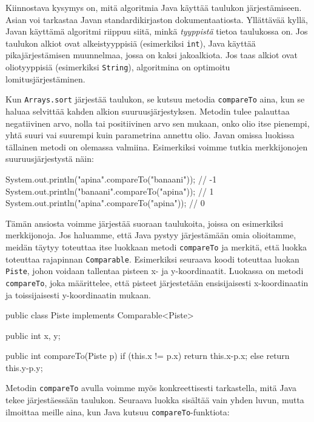 Kiinnostava kysymys on, mitä algoritmia Java käyttää
taulukon järjes\-tämiseen.
Asian voi tarkastaa Javan standardikirjaston
dokumentaatiosta.
Yllättävää kyllä, Javan käyttämä algoritmi riippuu siitä,
minkä \emph{tyyppistä} tietoa taulukossa on.
Jos taulukon alkiot ovat alkeistyyppisiä
(esimerkiksi \texttt{int}), Java käyttää 
pikajärjestämisen muunnelmaa,
jossa on kaksi jakoalkiota.
Jos taas alkiot ovat oliotyyppisiä
(esimerkiksi \texttt{String}),
algoritmina on optimoitu lomitusjärjestäminen.

Kun \texttt{Arrays.sort} järjestää taulukon,
se kutsuu metodia \texttt{compareTo} aina, kun se haluaa selvittää
kahden alkion suuruusjärjestyksen.
Metodin tulee palauttaa negatiivinen arvo, nolla tai positiivinen arvo
sen mukaan, onko olio itse pienempi, yhtä suuri vai suurempi
kuin parametrina annettu olio.
Javan omissa luokissa tällainen metodi on olemassa valmiina.
Esimerkiksi voimme tutkia merkkijonojen suuruusjärjestystä näin:

\begin{code}
System.out.println("apina".compareTo("banaani")); // -1
System.out.println("banaani".compareTo("apina")); // 1
System.out.println("apina".compareTo("apina")); // 0
\end{code}

Tämän ansiosta voimme järjestää suoraan taulukoita,
joissa on esimerkiksi merkkijonoja.
Jos haluamme, että Java pystyy järjestämään omia olioitamme,
meidän täytyy toteuttaa itse luokkaan metodi \texttt{compareTo} ja
merkitä, että luokka toteuttaa rajapinnan \texttt{Comparable}.
Esimerkiksi seuraava koodi toteuttaa luokan \texttt{Piste},
johon voidaan tallentaa pisteen x- ja y-koordinaatit.
Luokassa on metodi \texttt{compareTo}, joka määrittelee,
että pisteet järjestetään ensisijaisesti x-koordinaatin ja
toissijaisesti y-koordinaatin mukaan.

\begin{code}
public class Piste implements Comparable<Piste> {
    public int x, y;

    public int compareTo(Piste p) {
        if (this.x != p.x) {
            return this.x-p.x;
        } else {
            return this.y-p.y;
        }
    }
}
\end{code}

Metodin \texttt{compareTo} avulla voimme myös konkreettisesti
tarkastella, mitä Java tekee järjestäessään taulukon.
Seuraava luokka sisältää vain yhden luvun,
mutta ilmoittaa meille aina, kun Java kutsuu
\texttt{compareTo}-funktiota:

